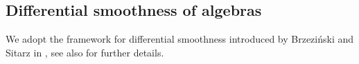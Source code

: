 \documentclass{amsart}
\theoremstyle{definition}
\theoremstyle{remark}
\numberwithin{equation}{section}
\begin{document}
\subsection{Differential smoothness of algebras}\label{DefinitionsandpreliminariesDSA}




We adopt the framework for differential smoothness introduced by Brzezi{\'n}ski and Sitarz in \cite[Section~2]{BrzezinskiSitarz2017}, see also \cite{Brzezinski2008, Brzezinski2014} for further details.
\end{document}

